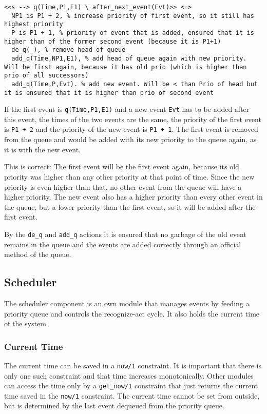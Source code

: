 \begin{lstlisting}
<<s --> q(Time,P1,E1) \ after_next_event(Evt)>> <=> 
  NP1 is P1 + 2, % increase priority of first event, so it still has highest priority
  P is P1 + 1, % priority of event that is added, ensured that it is higher than of the former second event (because it is P1+1)
  de_q(_), % remove head of queue
  add_q(Time,NP1,E1), % add head of queue again with new priority. Will be first again, because it has old prio (which is higher than prio of all successors)
  add_q(Time,P,Evt). % add new event. Will be < than Prio of head but it is ensured that it is higher than prio of second event
\end{lstlisting}

If the first event is \lstinline|q(Time,P1,E1)| and a new event \lstinline|Evt| has to be added after this event, the times of the two events are the same, the priority of the first event is \lstinline|P1 + 2| and the priority of the new event is \lstinline|P1 + 1|. The first event is removed from the queue and would be added with its new priority to the queue again, as it is with the new event. 

This is correct: The first event will be the first event again, because its old priority was higher than any other priority at that point of time. Since the new priority is even higher than that, no other event from the queue will have a higher priority. The new event also has a higher priority than every other event in the queue, but a lower priority than the first event, so it will be added after the first event.

By the \lstinline|de_q| and \lstinline|add_q| actions it is ensured that no garbage of the old event remains in the queue and the events are added correctly through an official method of the queue.

\subsection{Scheduler}
\label{implementation:scheduler}

The scheduler component is an own module that manages events by feeding a priority queue and controls the recognize-act cycle. It also holds the current time of the system. 

\subsubsection{Current Time}

The current time can be saved in a \lstinline|now/1| constraint. It is important that there is only one such constraint and that time increases monotonically. Other modules can access the time only by a \lstinline|get_now/1| constraint that just returns the current time saved in the \lstinline|now/1| constraint. The current time cannot be set from outside, but is determined by the last event dequeued from the priority queue.

